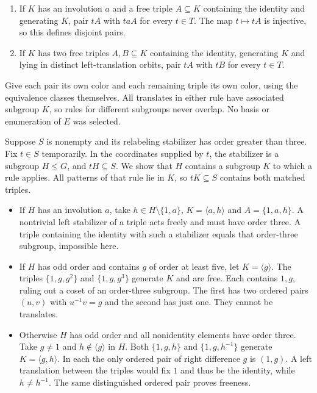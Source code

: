 \documentclass[11pt]{article}
\providecommand{\tightlist}{\setlength{\itemsep}{0pt}\setlength{\parskip}{0pt}}
\begin{document}
\begin{enumerate}
\def\labelenumi{\arabic{enumi}.}
\tightlist
\item
  If \(K\) has an involution \(a\) and a free triple \(A\subseteq K\) containing the identity and generating \(K\), pair \(tA\) with \(taA\) for every \(t\in T\). The map \(t\mapsto tA\) is injective, so this defines disjoint pairs.
\item
  If \(K\) has two free triples \(A,B\subseteq K\) containing the identity, generating \(K\) and lying in distinct left-translation orbits, pair \(tA\) with \(tB\) for every \(t\in T\).
\end{enumerate}

Give each pair its own color and each remaining triple its own color, using the equivalence classes themselves. All translates in either rule have associated subgroup \(K\), so rules for different subgroups never overlap. No basis or enumeration of \(E\) was selected.

Suppose \(S\) is nonempty and its relabeling stabilizer has order greater than three. Fix \(t\in S\) temporarily. In the coordinates supplied by \(t\), the stabilizer is a subgroup \(H\le G\), and \(tH\subseteq S\). We show that \(H\) contains a subgroup \(K\) to which a rule applies. All patterns of that rule lie in \(K\), so \(tK\subseteq S\) contains both matched triples.

\begin{itemize}
\tightlist
\item
  If \(H\) has an involution \(a\), take \(h\in H\setminus\{1,a\}\), \(K=\langle a,h\rangle\) and \(A=\{1,a,h\}\). A nontrivial left stabilizer of a triple acts freely and must have order three. A triple containing the identity with such a stabilizer equals that order-three subgroup, impossible here.
\item
  If \(H\) has odd order and contains \(g\) of order at least five, let \(K=\langle g\rangle\). The triples \(\{1,g,g^2\}\) and \(\{1,g,g^3\}\) generate \(K\) and are free. Each contains \(1,g\), ruling out a coset of an order-three subgroup. The first has two ordered pairs \((u,v)\) with \(u^{-1}v=g\) and the second has just one. They cannot be translates.
\item
  Otherwise \(H\) has odd order and all nonidentity elements have order three. Take \(g\ne1\) and \(h\notin\langle g\rangle\) in \(H\). Both \(\{1,g,h\}\) and \(\{1,g,h^{-1}\}\) generate \(K=\langle g,h\rangle\). In each the only ordered pair of right difference \(g\) is \((1,g)\). A left translation between the triples would fix \(1\) and thus be the identity, while \(h\ne h^{-1}\). The same distinguished ordered pair proves freeness.
\end{itemize}
\end{document}
